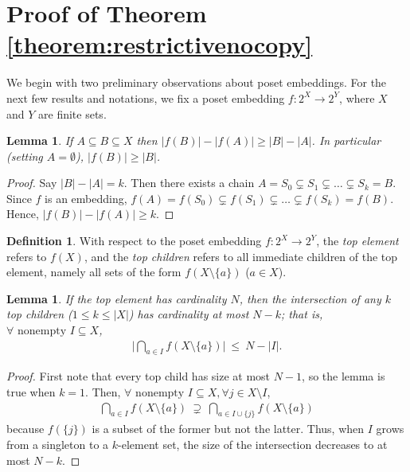 \documentclass[12pt]{article}
\newtheorem{lem}[thm]{Lemma}
\theoremstyle{definition}
\newtheorem{defi}[thm]{Definition}
\newtheorem{cla}[thm]{Claim}
\newcommand{\bp}{\begin{proof}}
\newcommand{\ep}{\end{proof}}
\newcommand{\eq}[1]{\begin{align*}#1\end{align*}}
\newcommand{\rb}{\{R,B\}}
\newcommand{\dcube}{2^{[2n]}}
\newcommand{\cube}{2^{[n]}}
\renewcommand{\ss}{S\subseteq [2n]}
\begin{document}
%
%


\section{Proof of Theorem \ref{theorem:restrictivenocopy}}

We begin with two preliminary observations about poset embeddings. For the next few results and notations, we fix a poset embedding $f:2^X\to2^Y$, where $X$ and $Y$ are finite sets.

\begin{lem}\label{lemma:postcard}
If $A \subseteq B\subseteq X$ then $|f(B)|-|f(A)|\ge |B|-|A|$. In particular (setting $A=\emptyset$), $|f(B)|\ge |B|$.
\end{lem}
\begin{proof}
Say $|B|-|A|=k$. Then there exists a chain $A=S_0\subsetneq S_1\subsetneq \dots \subsetneq S_k=B$. Since $f$ is an embedding, $f(A)=f(S_0)\subsetneq f(S_1)\subsetneq \dots\subsetneq f(S_k)=f(B)$. Hence, $|f(B)|-|f(A)|\ge k$.
\end{proof}

\begin{defi}
With respect to the poset embedding $f:2^X\to 2^Y$, the \textit{top element} refers to $f(X)$, and the \textit{top children} refers to all immediate children of the top element, namely all sets of the form $f(X\setminus \{a\})$ ($a\in X$).
\end{defi}
\begin{lem}\label{lemma:topch}
If the top element has cardinality $N$, then the intersection of any $k$ top children ($1\le k\le |X|$) has cardinality at most $N-k$; that is, $\forall\text{ nonempty } I\subseteq X$, \eq{
\bigg|\bigcap_{a\in I} f(X\setminus \{a\})\bigg|\ \le\ N-|I|.
}
\end{lem}
\bp
First note that every top child has size at most $N-1$, so the lemma is true when $k=1$. Then, $\forall \text{ nonempty } I\subseteq X, \forall j\in X\setminus I$, \eq{\bigcap_{a\in I} f(X\setminus \{a\})\ \supsetneq\ \bigcap_{a\in I\cup \{j\}} f(X\setminus \{a\})} because $f(\{j\})$ is a subset of the former but not the latter. Thus, when $I$ grows from a singleton to a $k$-element set, the size of the intersection decreases to at most $N-k$.
\ep
\end{document}
